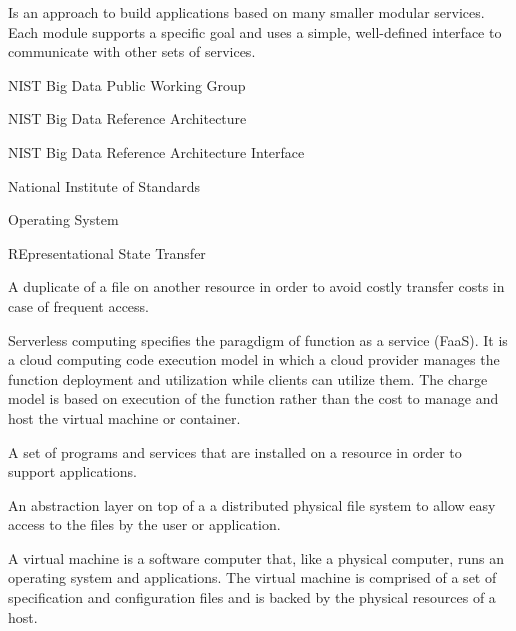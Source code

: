 \documentclass[10pt]{article}
\begin{document}
\begin{description}[leftmargin=8em,style=nextline]
\item[Microservice Architecture] Is an approach to build applications
  based on many smaller modular services. Each module supports a
  specific goal and uses a simple, well-defined interface to
  communicate with other sets of services.

\item[NBD-PWG]	       NIST Big Data Public Working Group

\item[NBDRA] 	       NIST Big Data Reference Architecture 

\item[NBDRAI] 	       NIST Big Data Reference Architecture Interface

\item[NIST] 	       National Institute of Standards

\item[OS] 	       Operating System

\item[REST] 	       REpresentational State Transfer

\item[Replica] A duplicate of a file on another resource in
  order to avoid costly transfer costs in case of frequent access.

\item[Serverless Computing] Serverless computing specifies the
  paragdigm of function as a service (FaaS). It is a cloud computing
  code execution model in which a cloud provider manages the function
  deployment and utilization while clients can utilize them. The
  charge model is based on execution of the function rather than the
  cost to manage and host the virtual machine or container.

\item[Software Stack] A set of programs and services that are
  installed on a resource in order to support applications.

\item[Virtual Filesysyem] An abstraction layer on top of a 
  a distributed physical file system to allow easy access to the files
  by the user or application.

\item[Virtual Machine] A virtual machine is a software computer that,
  like a physical computer, runs an operating system and applications.
  The virtual machine is comprised of a set of specification and
  configuration files and is backed by the physical resources of a
  host.


\end{description}
\end{document}
